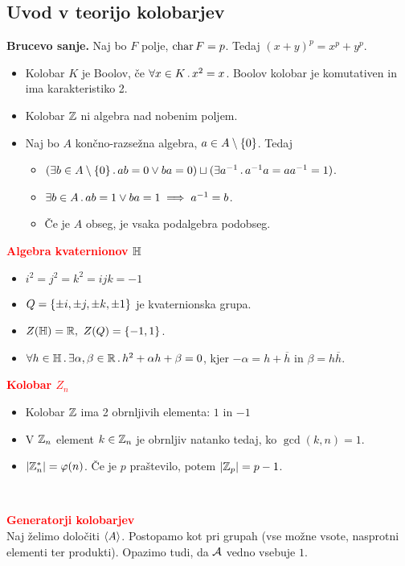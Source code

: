 \documentclass[a4paper,oneside,8pt,landscape]{extarticle}
\begin{document}
\begin{multicols*}{3}
\section{Uvod v teorijo kolobarjev}
\textbf{Brucevo sanje.} Naj bo \(F\) polje, \(\operatorname{char} F = p\). Tedaj \((x+y)^p = x^p + y^p\).
\begin{itemize}
    \item Kolobar \(K\) je Boolov, če \(\forall x \in K \,.\,x^2 = x\). Boolov kolobar je komutativen in ima karakteristiko 2. 
    \item Kolobar \(\mathbb{Z}\) ni algebra nad nobenim poljem.
    \item Naj bo \(A\) končno-razsežna algebra, \(a \in A \setminus \{0\}\). Tedaj
    \begin{itemize}
        \item \((\exists b \in A \setminus \{0\} \,.\, a b = 0 \lor ba = 0) \sqcup  (\exists a^{-1} \,.\, a^{-1}a=aa^{-1} = 1)\).
        \item \(\exists b \in A \,.\, ab = 1 \lor ba = 1 \implies a^{-1} = b\).
        \item Če je \(A\) obseg, je vsaka podalgebra podobseg.
    \end{itemize}
\end{itemize}
%
%
\textbf{\textcolor{red}{Algebra kvaternionov \(\mathbb{H}\)}}
\begin{itemize}
    \item \(i^2=j^2=k^2=ijk=-1\)
    \item \(Q = \{\pm i, \pm j, \pm k, \pm 1\}\) je kvaternionska grupa.
    \item \(Z(\mathbb{H}) = \mathbb{R}, \ Z(Q) = \{-1, 1\}\).
    \item \(\forall h \in \mathbb{H} \,.\, \exists \alpha, \beta \in \mathbb{R} \,.\, h^2 + \alpha h + \beta = 0\), kjer \(-\alpha = h + \overline{h}\) in \(\beta = h \overline{h}\).
\end{itemize}
%
%
\textbf{\textcolor{red}{Kolobar \(Z_n\)}}
\begin{itemize}
    \item Kolobar \(\mathbb{Z}\) ima 2 obrnljivih elementa: \(1\) in \(-1\)
    \item V \(\mathbb{Z}_n\) element \(k \in \mathbb{Z}_n\) je obrnljiv natanko tedaj, ko \(\gcd (k, n) = 1\).
    \item \(|\mathbb{Z}_n^*| = \varphi(n)\). Če je \(p\) praštevilo, potem \(|\mathbb{Z}_p| = p - 1\).
\end{itemize}
%
%
\

\textbf{\textcolor{red}{Generatorji kolobarjev}}\\
Naj želimo določiti \(\langle {A} \rangle\). Postopamo kot pri grupah (vse možne vsote, nasprotni elementi ter produkti). Opazimo tudi, da \(\mathcal{A}\) vedno vsebuje \(1\). 
%
%

\end{multicols*}
\end{document}
